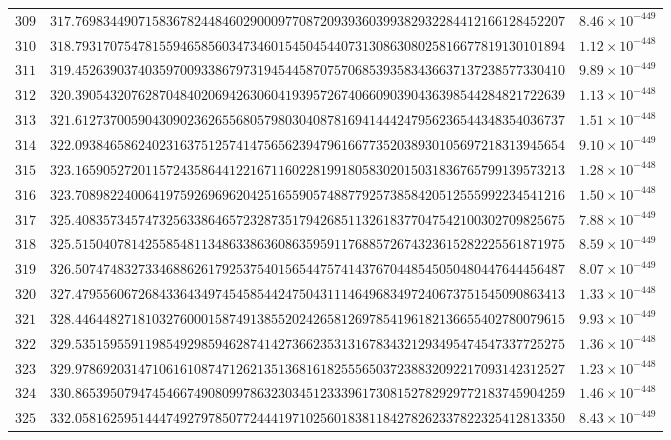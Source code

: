 \documentclass[12pt,reqno]{amsart}
\theoremstyle{remark}
\begin{document}
\begin{longtable}{clc}
$309$ & $317.7698344907158367824484602900097708720939360399382932284412166128452207$ & $8.46\times 10^{-449}$ \\
$310$ & $318.7931707547815594658560347346015450454407313086308025816677819130101894$ & $1.12\times 10^{-448}$ \\
$311$ & $319.4526390374035970093386797319454458707570685393583436637137238577330410$ & $9.89\times 10^{-449}$ \\
$312$ & $320.3905432076287048402069426306041939572674066090390436398544284821722639$ & $1.13\times 10^{-448}$ \\
$313$ & $321.6127370059043090236265568057980304087816941444247956236544348354036737$ & $1.51\times 10^{-448}$ \\
$314$ & $322.0938465862402316375125741475656239479616677352038930105697218313945654$ & $9.10\times 10^{-449}$ \\
$315$ & $323.1659052720115724358644122167116022819918058302015031836765799139573213$ & $1.28\times 10^{-448}$ \\
$316$ & $323.7089822400641975926969620425165590574887792573858420512555992234541216$ & $1.50\times 10^{-448}$ \\
$317$ & $325.4083573457473256338646572328735179426851132618377047542100302709825675$ & $7.88\times 10^{-449}$ \\
$318$ & $325.5150407814255854811348633863608635959117688572674323615282225561871975$ & $8.59\times 10^{-449}$ \\
$319$ & $326.5074748327334688626179253754015654475741437670448545050480447644456487$ & $8.07\times 10^{-449}$ \\
$320$ & $327.4795560672684336434974545854424750431114649683497240673751545090863413$ & $1.33\times 10^{-448}$ \\
$321$ & $328.4464482718103276000158749138552024265812697854196182136655402780079615$ & $9.93\times 10^{-449}$ \\
$322$ & $329.5351595591198549298594628741427366235313167834321293495474547337725275$ & $1.36\times 10^{-448}$ \\
$323$ & $329.9786920314710616108747126213513681618255565037238832092217093142312527$ & $1.23\times 10^{-448}$ \\
$324$ & $330.8653950794745466749080997863230345123339617308152782929772183745904259$ & $1.46\times 10^{-448}$ \\
$325$ & $332.0581625951444749279785077244419710256018381184278262337822325412813350$ & $8.43\times 10^{-449}$ \\

\end{longtable}
\end{document}
